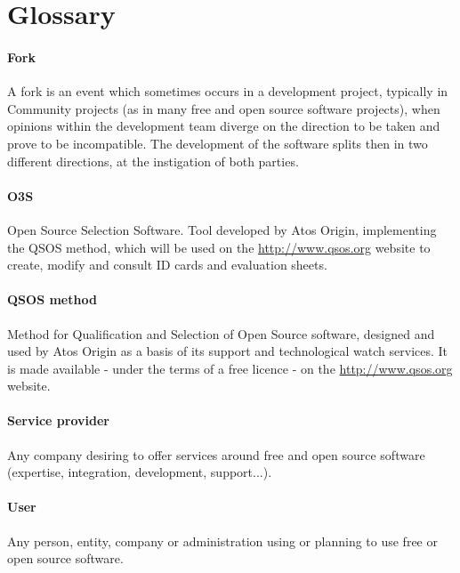 %
\section*{Glossary}


\paragraph{Fork}
A fork is an event which sometimes occurs in a development project, typically in 
Community projects (as in many free and open source software projects), when opinions 
within the development team diverge on the direction to be taken and prove to be incompatible. 
The development of the software splits then in two different directions, 
at the instigation of both parties.

\paragraph{O3S}
Open Source Selection Software. Tool developed by Atos Origin, implementing the 
QSOS method, which will be used on the \url{http://www.qsos.org} website to create, 
modify and consult ID cards and evaluation sheets.

\paragraph{QSOS method}
Method for Qualification and Selection of Open Source software, designed and used by Atos Origin as a basis of its support and technological watch services. It is made available - under the terms of a free licence - on the  \url{http://www.qsos.org} website.

\paragraph{Service provider}
Any company desiring to offer services around free and open source software (expertise, integration, development, support...).

\paragraph{User}
Any person, entity, company or administration using or planning to use free or open source software.




